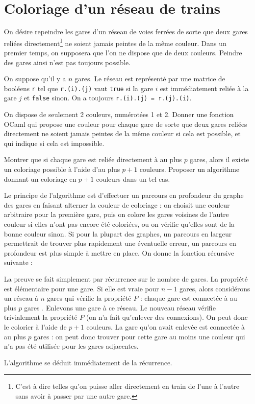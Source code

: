 \renewcommand{\SourceFile}{5-graphes/src/5-4.ml}

\section{Coloriage d'un réseau de trains}

On désire repeindre les gares d'un réseau de voies ferrées de sorte que deux gares reliées directement\footnote{C'est à dire telles qu'on puisse aller directement en train de l'une à l'autre sans avoir à passer par une autre gare.} ne soient jamais peintes de la même couleur. Dans un premier temps, on supposera que l'on ne dispose que de deux couleurs. Peindre des gares ainsi n'est pas toujours possible.
\medskip

On suppose qu'il y a $n$ gares. Le réseau est représenté par une matrice de booléens \texttt{r} tel que \texttt{r.(i).(j)} vaut \texttt{true} si la gare $i$ est immédiatement reliée à la gare $j$ et \texttt{false} sinon. On a toujours \texttt{r.(i).(j) = r.(j).(i)}.

\Q
On dispose de seulement 2 couleurs, numérotées 1 et 2. Donner une fonction OCaml qui propose une couleur pour chaque gare de sorte que deux gares reliées directement ne soient jamais peintes de la même couleur si cela est possible, et qui indique si cela est impossible.

\Q
Montrer que si chaque gare est reliée directement à au plus $p$ gares, alors il existe un coloriage possible à l'aide d'au plus $p+1$ couleurs. Proposer un algorithme donnant un coloriage en $p+1$ couleurs dans un tel cas.

\Corrige

\Q
Le principe de l'algorithme est d'effectuer un parcours en profondeur du graphe des gares en faisant alterner la couleur de coloriage : on choisit une couleur arbitraire pour la première gare, puis on colore les gares voisines de l'autre couleur si elles n'ont pas encore été coloriées, ou on vérifie qu'elles sont de la bonne couleur sinon. Si pour la plupart des graphes, un parcours en largeur permettrait de trouver plus rapidement une éventuelle erreur, un parcours en profondeur est plus simple à mettre en place. On donne la fonction récursive suivante :
\newpage



\Q
La preuve se fait simplement par récurrence sur le nombre de gares. La propriété est élémentaire pour une gare. Si elle est vraie pour $n-1$ gares, alors considérons un réseau à $n$ gares qui vérifie la propriété $P$ : \og chaque gare est connectée à au plus $p$ gares \fg{}. Enlevons une gare à ce réseau. Le nouveau réseau vérifie trivialement la propriété $P$ (on n'a fait qu'enlever des connexions). On peut donc le colorier à l'aide de $p+1$ couleurs. La gare qu'on avait enlevée est connectée à au plus $p$ gares : on peut donc trouver pour cette gare au moins une couleur qui n'a pas été utilisée pour les gares adjacentes.
\medskip

L'algorithme se déduit immédiatement de la récurrence.
\bigskip

\Fin
